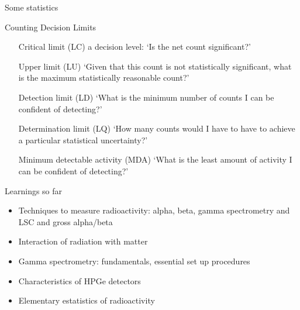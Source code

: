 \begin{frame}{Some statistics}

\alert{Counting Decision Limits}

\begin{flushright}

\begin{minipage}{0.6\textwidth}
{\scriptsize 
\begin{itemize}
\item[Critical limit (LC)] a decision level: ‘Is the net count significant?’
\item[Upper limit (LU)] ‘Given that this count is not statistically significant, what is the maximum statistically reasonable count?’
\item[Detection limit (LD)] ‘What is the minimum number of counts I can be confident of detecting?’
\item[Determination limit (LQ)] ‘How many counts would I have to have to achieve a particular statistical uncertainty?’
\item[Minimum detectable activity (MDA)] ‘What is the least amount of activity I can be confident of detecting?’
\end{itemize}
}
\end{minipage}
\end{flushright}

\end{frame}

\begin{frame}{Learnings so far}

\begin{alertblock}{}

\begin{itemize}

\pause \item Techniques to measure radioactivity: alpha, beta, gamma spectrometry and LSC and gross alpha/beta

\pause \item Interaction of radiation with matter

\pause \item Gamma spectrometry: fundamentals, essential set up procedures

\pause \item Characteristics of HPGe detectors

\pause \item Elementary estatistics of radioactivity


\end{itemize}

\end{alertblock}

\end{frame}